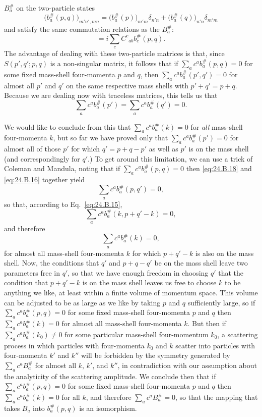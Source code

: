 $B_a^\#$ on the two-particle states
\begin{equation}
 \bigl(b_a^\#(p,q)\bigr)_{m'n',mn}
 =\bigl(b_a^\#(p)\bigr)_{m'm}\delta_{n'n}
 +\bigl(b_a^\#(q)\bigr)_{n'n}\delta_{m'm}
\tag{24.B.16}\label{eq:24.B.16}
\end{equation}
and satisfy the same commutation relations as the $B_a^\#$:
\begin{equation}
 [b_a^\#(p,q),b_b^\#(p,q)]
 =i\sum_c C^c{}_{ab}b_c^\#(p,q).
\tag{24.B.17}\label{eq:24.B.17}
\end{equation}
The advantage of dealing with these two-particle matrices is that, since
$S(p',q';p,q)$ is a non-singular matrix, it follows that if
$\sum_a c^a b_a^\#(p,q)=0$ for some fixed mass-shell
four-momenta $p$ and $q$, then
$\sum_a c^a b_a^\#(p',q')=0$ for almost all $p'$ and $q'$ on
the same respective mass shells with $p'+q'=p+q$. Because we are dealing now
with traceless matrices, this tells us that
\begin{equation}
 \sum_a c^a b_a^\#(p')
 =\sum_a c^a b_a^\#(q')=0.
\tag{24.B.18}\label{eq:24.B.18}
\end{equation}

We would like to conclude from this that
$\sum_a c^a b_a^\#(k)=0$ for \emph{all} mass-shell
four-momenta $k$, but so far we have proved only that
$\sum_a c^a b_a^\#(p')=0$ for almost all of those $p'$ for
which $q'=p+q-p'$ as well as $p'$ is on the mass shell (and correspondingly
for $q'$.) To get around this limitation, we can use a trick of Coleman and
Mandula, noting that if $\sum_a c^a b_a^\#(p,q)=0$ then
\eqref{eq:24.B.18} and \eqref{eq:24.B.16} together yield
\[
 \sum_a c^a b_a^\#(p,q')=0,
\]
so that, according to Eq.~\eqref{eq:24.B.15},
\[
 \sum_a c^a b_a^\#(k,p+q'-k)=0,
\]
and therefore
\begin{equation}
 \sum_a c^a b_a^\#(k)=0,
\tag{24.B.19}\label{eq:24.B.19}
\end{equation}
for almost all mass-shell four-momenta $k$ for which $p+q'-k$ is also on the
mass shell. Now, the conditions that $q'$ and $p+q-q'$ be on the mass shell
leave two parameters free in $q'$, so that we have enough freedom in choosing
$q'$ that the condition that $p+q'-k$ is on the mass shell leaves us free to
choose $k$ to be anything we like, at least within a finite volume of momentum
space. This volume can be adjusted to be as large as we like by taking $p$ and
$q$ sufficiently large, so if
$\sum_a c^a b_a^\#(p,q)=0$ for some fixed mass-shell
four-momenta $p$ and $q$ then $\sum_a c^a b_a^\#(k)=0$ for
almost all mass-shell four-momenta $k$. But then if
$\sum_a c^a b_a^\#(k_0)\ne0$ for some particular mass-shell
four-momentum $k_0$, a scattering process in which particles with four-momenta
$k_0$ and $k$ scatter into particles with four-momenta $k'$ and $k''$ will be
forbidden by the symmetry generated by $\sum_a c^a B_a^\#$ for
almost all $k$, $k'$, and $k''$, in contradiction with our assumption about
the analyticity of the scattering amplitude. We conclude then that if
$\sum_a c^a b_a^\#(p,q)=0$ for some fixed mass-shell
four-momenta $p$ and $q$ then $\sum_a c^a b_a^\#(k)=0$ for all
$k$, and therefore $\sum_a c^a B_a^\#=0$, so that the mapping
that takes $B_a$ into $b_a^\#(p,q)$ is an isomorphism.


